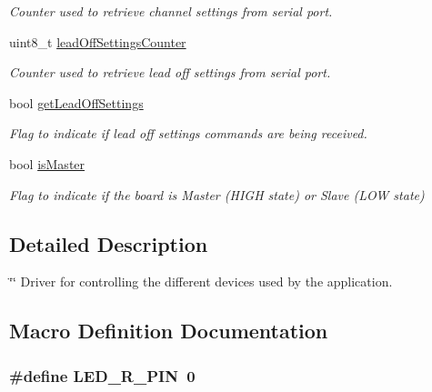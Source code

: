 \begin{DoxyCompactItemize}
\begin{DoxyCompactList}\small\item\em Counter used to retrieve channel settings from serial port. \end{DoxyCompactList}\item 
uint8\+\_\+t \hyperlink{group___devices___library_gacaa36aec7dee3c3535b27afc88dcfc9c}{lead\+Off\+Settings\+Counter}
\begin{DoxyCompactList}\small\item\em Counter used to retrieve lead off settings from serial port. \end{DoxyCompactList}\item 
bool \hyperlink{group___devices___library_ga774931d6c0caa199a9884bce2b300439}{get\+Lead\+Off\+Settings}
\begin{DoxyCompactList}\small\item\em Flag to indicate if lead off settings commands are being received. \end{DoxyCompactList}\item 
bool \hyperlink{group___devices___library_ga6ceb9b5a0a67762763468c0ac71705fe}{is\+Master}
\begin{DoxyCompactList}\small\item\em Flag to indicate if the board is Master (H\+I\+G\+H state) or Slave (L\+O\+W state) \end{DoxyCompactList}\end{DoxyCompactItemize}


\subsection{Detailed Description}
\char`\"{}\char`\"{} Driver for controlling the different devices used by the application. 

\subsection{Macro Definition Documentation}
\hypertarget{group___devices___library_ga22f3cf4ef9dadad8d78d5c59999100b6}{}
\subsubsection[{L\+E\+D\+\_\+\+R\+\_\+\+P\+I\+N}]{\setlength{\rightskip}{0pt plus 5cm}\#define L\+E\+D\+\_\+\+R\+\_\+\+P\+I\+N~0}\label{group___devices___library_ga22f3cf4ef9dadad8d78d5c59999100b6}
\hypertarget{group___devices___library_ga5a11a7cbc215e25401541277460113a4}{}
